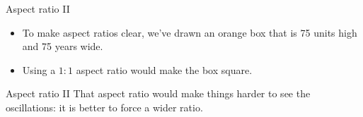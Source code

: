 \documentclass[
  ignorenonframetext,
]{beamer}
\newenvironment{Shaded}{\begin{snugshade}}{\end{snugshade}}
\newcommand{\AttributeTok}[1]{\textcolor[rgb]{0.13,0.29,0.53}{#1}}
\newcommand{\FunctionTok}[1]{\textcolor[rgb]{0.13,0.29,0.53}{\textbf{#1}}}
\newcommand{\NormalTok}[1]{#1}
\newcommand{\OtherTok}[1]{\textcolor[rgb]{0.56,0.35,0.01}{#1}}
\newcommand{\SpecialCharTok}[1]{\textcolor[rgb]{0.81,0.36,0.00}{\textbf{#1}}}
\providecommand{\tightlist}{%
  \setlength{\itemsep}{0pt}\setlength{\parskip}{0pt}}
\begin{document}
\begin{frame}[fragile]{Aspect ratio II}
\label{aspect-ratio-ii-2}
\begin{itemize}
\tightlist
\item
  To make aspect ratios clear, we've drawn an orange box that is 75
  units high and 75 years wide.
\end{itemize}


\begin{Shaded}
\end{Shaded}

\begin{itemize}
\tightlist
\item
  Using a \(1:1\) aspect ratio would make the box square.
\end{itemize}
\end{frame}

\begin{frame}{Aspect ratio II}
\label{aspect-ratio-ii-3}
That aspect ratio would make things harder to see the oscillations: it
is better to force a wider ratio.
\end{frame}
\end{document}
